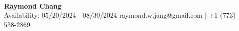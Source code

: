 \documentclass[margin,line]{./templates/resume}
\begin{document}
{\sc \hspace*{4mm}\vspace{0mm}\\
\LARGE \textbf{Raymond Chang}}
\vspace{1mm}\\
\small Availability: 05/20/2024 - 08/30/2024 \hspace*{57mm} \small raymond.w.jang@gmail.com | +1 (773) 558-2869
\vspace*{1mm}
\begin{resume}











\end{resume}   
\end{document}
